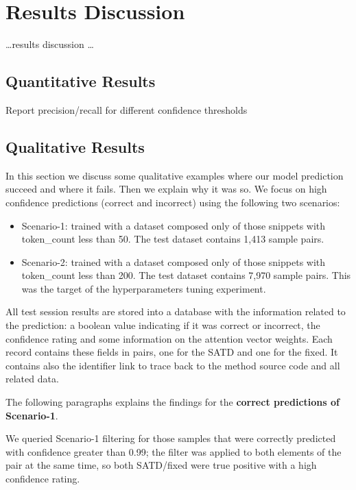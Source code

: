 \chapter{Results Discussion}

\dots results discussion \dots 

\section{Quantitative Results}
Report precision/recall for different confidence thresholds


\section{Qualitative Results}

In this section we discuss some qualitative examples where our model prediction succeed and where it fails. Then we explain why it was so.
We focus on high confidence predictions  (correct and incorrect) using the following two scenarios:
\begin{itemize}
    \item Scenario-1: trained with a dataset composed only of those snippets with token\_count less than 50. The test dataset contains 1,413 sample pairs.
    \item Scenario-2: trained with a dataset composed only of those snippets with token\_count less than 200. The test dataset contains 7,970 sample pairs. This was the target of the hyperparameters tuning experiment.
\end{itemize}

All test session results are stored into a database with the information related to the prediction: a boolean value indicating if it was correct or incorrect, the confidence rating and some information on the attention vector weights. Each record contains these fields in pairs, one for the SATD and one for the fixed. It contains also the identifier link to trace back to the method source code and all related data.

The following paragraphs explains the findings for the \textbf{correct predictions of Scenario-1}.

We queried Scenario-1 filtering for those samples that were correctly predicted with confidence greater than 0.99; the filter was applied to both elements of the pair at the same time, so both SATD/fixed were true positive with a high confidence rating.

